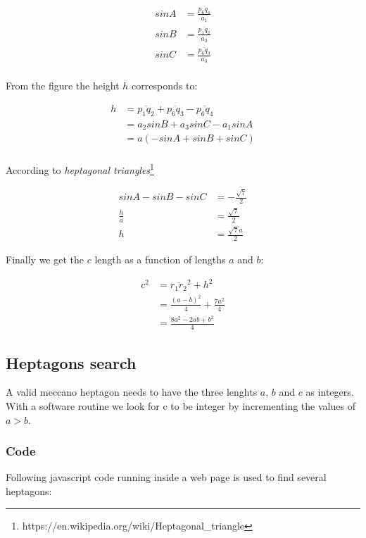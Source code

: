 \documentclass[11pt]{article}
\begin{document}
\begin{align*}
sinA &= \frac{\overline{p_6 q_4}}{a_1} \\
sinB &= \frac{\overline{p_1 q_2}}{a_2} \\
sinC &= \frac{\overline{p_6 q_3}}{a_3} \\
\end{align*}

From the figure the height $h$ corresponds to:

\begin{align*}
h &= \overline{p_1 q_2} + \overline{p_6 q_3} - \overline{p_6 q_4} \\
  &= a_2sinB + a_3sinC - a_1sinA \\
  &= a(-sinA + sinB + sinC)\\
\end{align*}

According to \emph{heptagonal triangles}\footnote{https://en.wikipedia.org/wiki/Heptagonal\_triangle}

\begin{align*}
sinA - sinB - sinC &= -\frac{\sqrt{7}}{2} \\
       \frac{h}{a} &= \frac{\sqrt{7}}{2} \\
                 h &= \frac{\sqrt{7}a}{2}
\end{align*}


Finally we get the $c$ length as a function of lengths $a$ and $b$:

\begin{align*}
c^2 &= \overline{r_1 r_2}^2 + h^2 \\
    &= \frac{(a - b)^2}{4} + \frac{7a^2}{4} \\
    &= \frac{8a^2 - 2ab + b^2}{4}
\end{align*}

\subsection{Heptagons search}

A valid meccano heptagon needs to have the three lenghts $a$, $b$ and $c$ as integers. With a software routine we look for c to be integer by incrementing the values of $a > b$.

\subsubsection{Code}

Following javascript code running inside a web page is used to find several heptagons:
\end{document}
